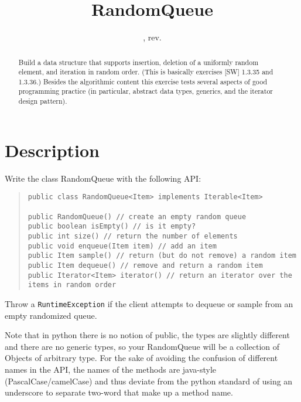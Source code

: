 \documentclass{tufte-handout}
\title{RandomQueue}
\author{}
\date{\GITAuthorDate, rev. \GITAbrHash}
\begin{document}
\maketitle

\begin{abstract}
  Build a data structure that supports insertion, deletion of a
  uniformly random element, and iteration in random order.
  (This is basically exercises [SW] 1.3.35 and 1.3.36.)
  Besides the algorithmic content this exercise tests several aspects
  of good programming practice (in particular, abstract data types,
  generics, and the iterator design pattern).
\end{abstract}

\section{Description}

Write the class RandomQueue with the following API:

\begin{quotation}
\begin{fullwidth}\small
\begin{verbatim}
public class RandomQueue<Item> implements Iterable<Item>

public RandomQueue() // create an empty random queue
public boolean isEmpty() // is it empty?
public int size() // return the number of elements
public void enqueue(Item item) // add an item
public Item sample() // return (but do not remove) a random item
public Item dequeue() // remove and return a random item
public Iterator<Item> iterator() // return an iterator over the items in random order
\end{verbatim}
\end{fullwidth}
\end{quotation}
Throw a {\tt RuntimeException} if the client attempts to dequeue or
sample from an empty randomized queue.

Note that in python there is no notion of public, the types are slightly different and there are no generic types, so your RandomQueue will be a collection of Objects of arbitrary type. 
For the sake of avoiding the confusion of different names in the API, the names of the methods are java-style (PascalCase/camelCase) and thus deviate from the python standard of using an underscore to separate two-word that make up a method name. 
\end{document}
